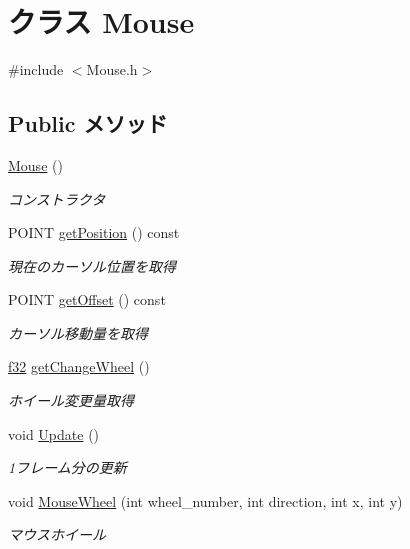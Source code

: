 \hypertarget{class_mouse}{\section{クラス Mouse}
\label{class_mouse}
}


{\ttfamily \#include $<$Mouse.\-h$>$}

\subsection*{Public メソッド}
\begin{DoxyCompactItemize}
\item 
\hyperlink{class_mouse_a99024d3700d649ae19c1537b42a3e86d}{Mouse} ()
\begin{DoxyCompactList}\small\item\em コンストラクタ \end{DoxyCompactList}\item 
P\-O\-I\-N\-T \hyperlink{class_mouse_af28a7cf98ce1b646b3e813a491530a9c}{get\-Position} () const 
\begin{DoxyCompactList}\small\item\em 現在のカーソル位置を取得 \end{DoxyCompactList}\item 
P\-O\-I\-N\-T \hyperlink{class_mouse_aa9270008e04dfc725c45c9b518119712}{get\-Offset} () const 
\begin{DoxyCompactList}\small\item\em カーソル移動量を取得 \end{DoxyCompactList}\item 
\hyperlink{_main_8h_a5f6906312a689f27d70e9d086649d3fd}{f32} \hyperlink{class_mouse_a38e178d9d764a8670d5682f0fe3f2f47}{get\-Change\-Wheel} ()
\begin{DoxyCompactList}\small\item\em ホイール変更量取得 \end{DoxyCompactList}\item 
void \hyperlink{class_mouse_add9756fabb1ae55d56e10b930e5592b6}{Update} ()
\begin{DoxyCompactList}\small\item\em 1フレーム分の更新 \end{DoxyCompactList}\item 
void \hyperlink{class_mouse_a2d4332520f8cf872de6e85419cf54750}{Mouse\-Wheel} (int wheel\-\_\-number, int direction, int x, int y)
\begin{DoxyCompactList}\small\item\em マウスホイール \end{DoxyCompactList}\end{DoxyCompactItemize}


